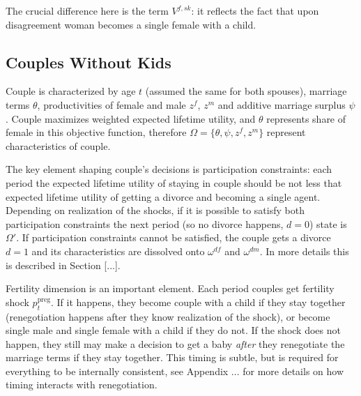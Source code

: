 % 
The crucial difference here is the term $V^{f,sk}$: it reflects the fact that upon disagreement woman becomes a single female with a child. 

\subsection{Couples Without Kids}
Couple is characterized by age $t$ (assumed the same for both spouses), marriage terms $\theta$, productivities of female and male $z^f$, $z^m$ and additive marriage surplus $\psi$. Couple maximizes weighted expected lifetime utility, and $\theta$ represents share of female in this objective function, therefore $\Omega = \{\theta,\psi,z^f,z^m\}$ represent characteristics of couple.

The key element shaping couple's decisions is participation constraints: each period the expected lifetime utility of staying in couple should be not less that expected lifetime utility of getting a divorce and becoming a single agent. Depending on realization of the shocks, if it is possible to satisfy both participation constraints the next period (so no divorce happens, $d = 0$) state is $\Omega'$. If participation constraints cannot be satisfied, the couple gets a divorce $d = 1$ and its characteristics are dissolved onto $\omega^{df}$ and $\omega^{dm}$.  In more details this is described in Section [...].

Fertility dimension is an important element. Each period couples get fertility shock $p^{\text{preg}}_t$. If it happens, they become couple with a child if they stay together (renegotiation happens after they know realization of the shock), or become single male and single female with a child if they do not. If the shock does not happen, they still may make a decision to get a baby \emph{after} they renegotiate the marriage terms if they stay together. This timing is subtle, but is required for everything to be internally consistent, see Appendix ... for more details on how timing interacts with renegotiation. 

